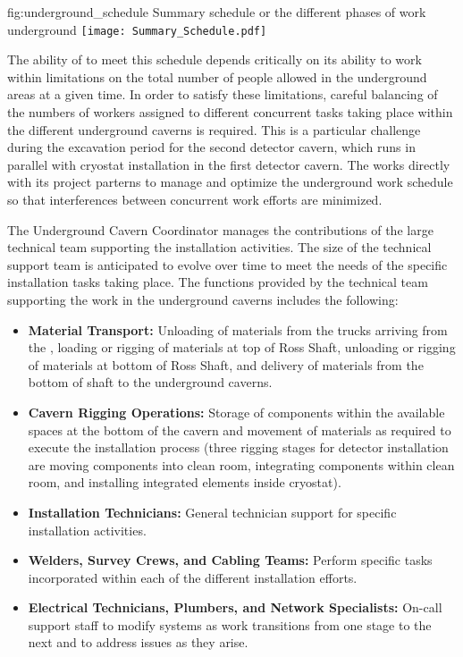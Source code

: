\begin{dunefigure}{fig:underground_schedule}
  {Summary schedule or the different phases of work underground}
  \texttt{[image: Summary\_Schedule.pdf]}
\end{dunefigure}

The ability of  to meet this schedule depends 
critically on its ability to work within limitations on the total
number of people allowed in the underground areas at a given time.
In order to satisfy these limitations, careful balancing of the 
numbers of workers assigned to different concurrent tasks taking 
place within the different underground caverns is required.  
This is a particular challenge during the excavation period for 
the second detector cavern, which runs in parallel with cryostat
installation in the first detector cavern.  The  works 
directly with its  project parterns to manage 
and optimize the underground work schedule so that interferences 
between concurrent work efforts are minimized.

The Underground Cavern Coordinator manages the contributions of 
the large technical team supporting the installation activities.
The size of the technical support team is anticipated to evolve  
over time to meet the needs of the specific installation tasks 
taking place.  The functions provided by the technical team 
supporting the work in the underground caverns includes the
following:

\begin{itemize}
  \item {\bf Material Transport:} Unloading of materials from the 
        trucks arriving from the , loading or rigging 
        of materials at top of Ross Shaft, unloading or rigging 
        of materials at bottom of Ross Shaft, and delivery of 
        materials from the bottom of shaft to the underground 
        caverns.        
  \item {\bf Cavern Rigging Operations:}  Storage of 
        components within the available spaces at the bottom 
        of the cavern and movement of materials as required to 
        execute the installation process (three rigging stages
        for detector installation are moving components into 
        clean room, integrating components within clean room, 
        and installing integrated elements inside cryostat).
  \item {\bf Installation Technicians:}  General technician 
        support for specific installation activities. 
  \item {\bf Welders, Survey Crews, and Cabling Teams:}  Perform 
        specific tasks incorporated within each of the different 
        installation efforts.
  \item {\bf Electrical Technicians, Plumbers, and Network 
        Specialists:}  On-call support staff to modify systems 
        as work transitions from one stage to the next and to 
        address issues as they arise.             
\end{itemize}   
    
